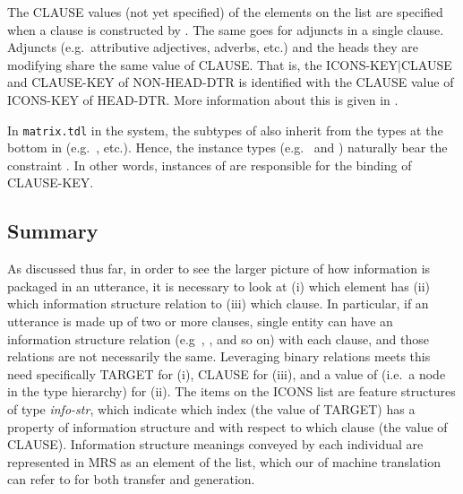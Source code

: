 
\noindent The CLAUSE values (not yet specified) of the elements on the
 list are specified when a clause is constructed by
. The same goes for adjuncts in a
single clause.  Adjuncts (e.g.\ attributive adjectives, adverbs, etc.)
and the heads they are modifying share the same value of
CLAUSE. That is, the ICONS-KEY{$\mid$}CLAUSE
and CLAUSE-KEY of NON-HEAD-DTR is identified with the CLAUSE value of
ICONS-KEY of HEAD-DTR. More information about this is given in
.





In \texttt{matrix.tdl} in the \lingo {} system, the
subtypes of  also inherit from the types at the
bottom in  (e.g.\ ,
etc.). Hence, the instance types (e.g.\ 
and ) naturally bear the constraint
. In other words, instances of
 are responsible for the binding of CLAUSE-KEY.




\subsection{Summary}
\label{9:ssec:icons-summary}

As discussed thus far, in order to see the larger picture of how
information is packaged in an utterance, it is necessary to look at
(i) which element has (ii) which information structure relation to
(iii) which clause. In particular, if an utterance is made up of two
or more clauses, single entity can have an information structure
relation (e.g\ , , and so on) with each clause, and those
relations are not necessarily the
same. Leveraging binary
relations meets this need specifically TARGET for (i), CLAUSE for
(iii), and a value of  (i.e.\ a
node in the type hierarchy) for (ii). The items on the ICONS list are
feature structures of type \textit{info-str}, which indicate which
index (the value of TARGET) has a property of information structure
and with respect to which clause (the value of CLAUSE).  Information
structure meanings conveyed by each individual are represented in MRS
as an element of the  list, which our
 of machine translation can refer to for both
transfer and generation.



